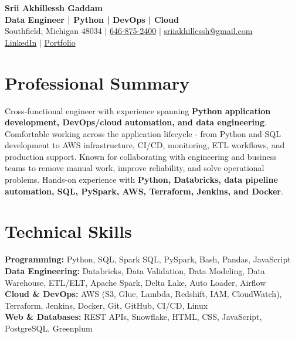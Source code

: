 \documentclass[letterpaper,10pt]{article}
\begin{document}
\fontsize{9.35pt}{10.45pt}\selectfont

\begin{center}
    {\LARGE \textbf{Srii Akhillessh Gaddam}} \\[-1pt]
    \textbf{Data Engineer | Python | DevOps | Cloud} \\[2pt]
    Southfield, Michigan 48034 $|$
    \href{tel:6468752400}{646-875-2400} $|$
    \href{mailto:sriiakhillessh@gmail.com}{sriiakhillessh@gmail.com} \\[1pt]
    \href{https://www.linkedin.com/in/srii-akhiilessh-gaddam-b48668191/}{LinkedIn} $|$
    \href{https://sriiakhillesshg.github.io/portfolio/}{Portfolio}
\end{center}
\vspace{-8pt}

\section{Professional Summary}
\small{Cross-functional engineer with experience spanning \textbf{Python application development, DevOps/cloud automation, and data engineering}. Comfortable working across the application lifecycle - from Python and SQL development to AWS infrastructure, CI/CD, monitoring, ETL workflows, and production support. Known for collaborating with engineering and business teams to remove manual work, improve reliability, and solve operational problems. Hands-on experience with \textbf{Python, Databricks, data pipeline automation, SQL, PySpark, AWS, Terraform, Jenkins, and Docker}.}

\section{Technical Skills}
\small{
\textbf{Programming:} Python, SQL, Spark SQL, PySpark, Bash, Pandas, JavaScript \\
\textbf{Data Engineering:} Databricks, Data Validation, Data Modeling, Data Warehouse, ETL/ELT, Apache Spark, Delta Lake, Auto Loader, Airflow \\
\textbf{Cloud \& DevOps:} AWS (S3, Glue, Lambda, Redshift, IAM, CloudWatch), Terraform, Jenkins, Docker, Git, GitHub, CI/CD, Linux \\
\textbf{Web \& Databases:} REST APIs, Snowflake, HTML, CSS, JavaScript, PostgreSQL, Greenplum
}
\end{document}
